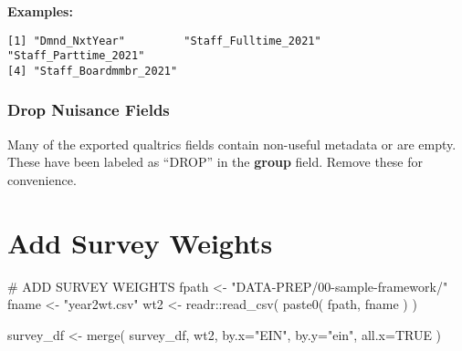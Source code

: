 \documentclass[
  letterpaper,
]{scrbook}
\newenvironment{Shaded}{\begin{snugshade}}{\end{snugshade}}
\newcommand{\AttributeTok}[1]{\textcolor[rgb]{0.40,0.45,0.13}{#1}}
\newcommand{\CommentTok}[1]{\textcolor[rgb]{0.37,0.37,0.37}{#1}}
\newcommand{\ConstantTok}[1]{\textcolor[rgb]{0.56,0.35,0.01}{#1}}
\newcommand{\FunctionTok}[1]{\textcolor[rgb]{0.28,0.35,0.67}{#1}}
\newcommand{\NormalTok}[1]{\textcolor[rgb]{0.00,0.23,0.31}{#1}}
\newcommand{\OtherTok}[1]{\textcolor[rgb]{0.00,0.23,0.31}{#1}}
\newcommand{\SpecialCharTok}[1]{\textcolor[rgb]{0.37,0.37,0.37}{#1}}
\newcommand{\StringTok}[1]{\textcolor[rgb]{0.13,0.47,0.30}{#1}}
\begin{document}
\textbf{Examples:}

\begin{verbatim}
[1] "Dmnd_NxtYear"         "Staff_Fulltime_2021"  "Staff_Parttime_2021" 
[4] "Staff_Boardmmbr_2021"
\end{verbatim}

\section*{Drop Nuisance Fields}\label{drop-nuisance-fields}


Many of the exported qualtrics fields contain non-useful metadata or are
empty. These have been labeled as ``DROP'' in the \textbf{group} field.
Remove these for convenience.

\begin{Shaded}
\end{Shaded}

\part{Add Survey Weights}

\begin{Shaded}
\begin{Highlighting}[]
\CommentTok{\# ADD SURVEY WEIGHTS }
\NormalTok{fpath }\OtherTok{\textless{}{-}} \StringTok{"DATA{-}PREP/00{-}sample{-}framework/"}
\NormalTok{fname }\OtherTok{\textless{}{-}} \StringTok{"year2wt.csv"}
\NormalTok{wt2  }\OtherTok{\textless{}{-}}\NormalTok{ readr}\SpecialCharTok{::}\FunctionTok{read\_csv}\NormalTok{( }\FunctionTok{paste0}\NormalTok{( fpath, fname ) )}

\NormalTok{survey\_df }\OtherTok{\textless{}{-}} \FunctionTok{merge}\NormalTok{( survey\_df, wt2, }\AttributeTok{by.x=}\StringTok{"EIN"}\NormalTok{, }\AttributeTok{by.y=}\StringTok{"ein"}\NormalTok{, }\AttributeTok{all.x=}\ConstantTok{TRUE}\NormalTok{ )}
\end{Highlighting}
\end{Shaded}
\end{document}
